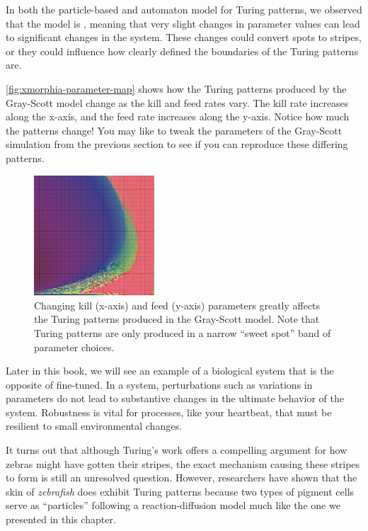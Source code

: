 In both the particle-based and automaton model for Turing patterns, we observed that the model is , meaning that very slight changes in parameter values can lead to significant changes in the system. These changes could convert spots to stripes, or they could influence how clearly defined the boundaries of the Turing patterns are.

\autoref{fig:xmorphia-parameter-map} shows how the Turing patterns produced by the Gray-Scott model change as the kill and feed rates vary. The kill rate increases along the x-axis, and the feed rate increases along the y-axis. Notice how much the patterns change! You may like to tweak the parameters of the Gray-Scott simulation from the previous section to see if you can reproduce these differing patterns.\\

\begin{figure}[h]
\centering
\mySfFamily
\includegraphics[width = 0.4\textwidth]{../images/xmorphia-parameter-map.jpg}
\caption{Changing kill (x-axis) and feed (y-axis) parameters greatly affects the Turing patterns produced in the Gray-Scott model. Note that Turing patterns are only produced in a narrow ``sweet spot'' band of parameter choices.}
\label{fig:xmorphia-parameter-map}
\end{figure}

Later in this book, we will see an example of a biological system that is the opposite of fine-tuned. In a  system, perturbations such as variations in parameters do not lead to substantive changes in the ultimate behavior of the system. Robustness is vital for processes, like your heartbeat, that must be resilient to small environmental changes.

It turns out that although Turing's work offers a compelling argument for how zebras might have gotten their stripes, the exact mechanism causing these stripes to form is still an unresolved question. However, researchers have shown that the skin of \textit{zebrafish} does exhibit Turing patterns because two types of pigment cells serve as ``particles'' following a reaction-diffusion model much like the one we presented in this chapter.

